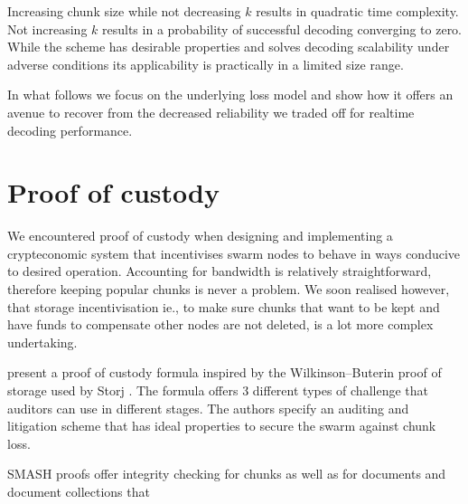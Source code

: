 \documentclass[12pt]{article}
\begin{document}
Increasing chunk size while not decreasing $k$ results in quadratic time complexity. Not increasing $k$ results in a probability of successful decoding converging to zero.
While the scheme has desirable properties and solves decoding scalability under adverse conditions its applicability is practically in a limited size range.

In what follows we focus on the underlying loss model and  show how it offers an avenue to recover from the decreased reliability we  traded off for realtime decoding performance.


\section{Proof of custody}

We encountered proof of custody when designing and implementing a crypteconomic system that incentivises swarm nodes to behave in ways conducive to desired operation.
Accounting for bandwidth is relatively straightforward, therefore keeping popular chunks is never a problem. We soon realised however, that storage incentivisation ie., to make sure chunks that want to be kept and have funds to compensate other nodes are not deleted, is a lot more complex undertaking.

\cite{ethersphere2016smash} present a proof of custody formula inspired by the Wilkinson--Buterin proof of storage used by Storj \cite{wilkinsonetal2014storj}. The formula offers 3 different types of challenge that auditors can use in different stages. The authors specify an auditing and litigation scheme that has ideal properties to secure the swarm against chunk loss.

SMASH proofs offer integrity checking for chunks as well as for documents and document collections that
\end{document}
